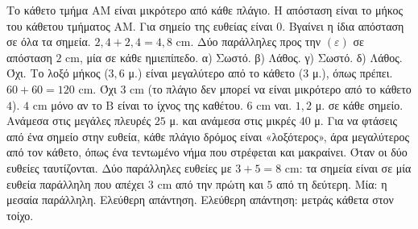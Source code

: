  Το κάθετο τμήμα $\mathrm{ΑΜ}$ είναι μικρότερο από κάθε πλάγιο.
 Η απόσταση είναι το μήκος του κάθετου τμήματος $\mathrm{ΑΜ}$. Για σημείο της ευθείας είναι $0$.
 Βγαίνει η ίδια απόσταση σε όλα τα σημεία.
 $2{,}4+2{,}4=4{,}8$ cm.
 Δύο παράλληλες προς την $(\varepsilon)$ σε απόσταση $2$ cm, μία σε κάθε ημιεπίπεδο.
 α) Σωστό. β) Λάθος. γ) Σωστό. δ) Λάθος.
 Όχι. Το λοξό μήκος ($3{,}6$ μ.) είναι μεγαλύτερο από το κάθετο ($3$ μ.), όπως πρέπει.
 $60+60=120$ cm.
 Όχι $3$ cm (το πλάγιο δεν μπορεί να είναι μικρότερο από το κάθετο $4$). $4$ cm μόνο αν το $\mathrm{Β}$ είναι το ίχνος της καθέτου. $6$ cm ναι.
 $1{,}2$ μ. σε κάθε σημείο.
 Ανάμεσα στις μεγάλες πλευρές $25$ μ. και ανάμεσα στις μικρές $40$ μ.
 Για να φτάσεις από ένα σημείο στην ευθεία, κάθε πλάγιο δρόμος είναι «λοξότερος», άρα μεγαλύτερος από τον κάθετο, όπως ένα τεντωμένο νήμα που στρέφεται και μακραίνει.
 Όταν οι δύο ευθείες ταυτίζονται.
 Δύο παράλληλες ευθείες με $3+5=8$ cm: τα σημεία είναι σε μία ευθεία παράλληλη που απέχει $3$ cm από την πρώτη και $5$ από τη δεύτερη.
 Μία: η μεσαία παράλληλη.
 Ελεύθερη απάντηση.
 Ελεύθερη απάντηση: μετράς κάθετα στον τοίχο.
